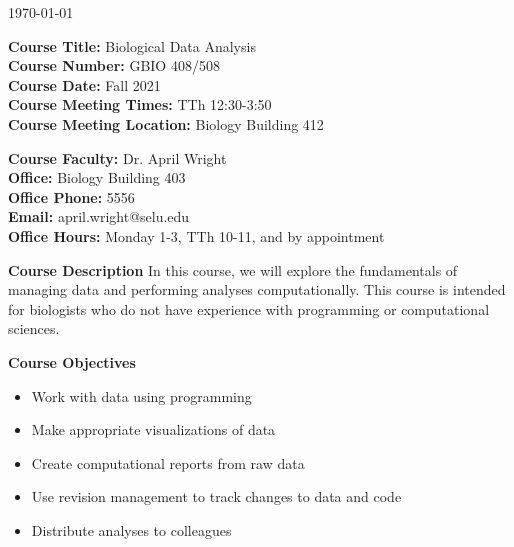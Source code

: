 \documentclass[12pt]{article}
\let\oldtextbf\textbf
\renewcommand{\textbf}[1]{\textcolor{coolblack}{\oldtextbf{#1}}}
\begin{document}
\thispagestyle{fancy}
\begin{flushright}
\today
\end{flushright}
\vspace{2mm}
\begin{flushleft}
\textbf{Course Title:} Biological Data Analysis \\
\textbf{Course Number:} GBIO 408/508\\


\textbf{Course Date:} Fall 2021 \\

\textbf{Course Meeting Times:} TTh 12:30-3:50 \\
\textbf{Course Meeting Location:} Biology Building 412 \\
\end{flushleft}

\bigskip

\begin{flushleft}
\textbf{Course Faculty:} Dr. April Wright \\
\textbf{Office:} Biology Building 403\\
\textbf{Office Phone:} 5556 \\
\textbf{Email:} april.wright@selu.edu   \\
\textbf{Office Hours:} Monday 1-3, TTh 10-11, and by appointment \\

\end{flushleft}

\bigskip

\begin{flushleft}

\textbf{Course Description}
In this course, we will explore the fundamentals of managing data and performing analyses computationally. This course is intended for biologists who do not have experience with programming or computational sciences. 

\end{flushleft}

\bigskip
\begin{flushleft}

\textbf{Course Objectives}

\begin{itemize}

\item Work with data using programming
\item Make appropriate visualizations of data
\item Create computational reports from raw data
\item Use revision management to track changes to data and code
\item Distribute analyses to colleagues

\end{itemize}
\end{flushleft}
\end{document}
